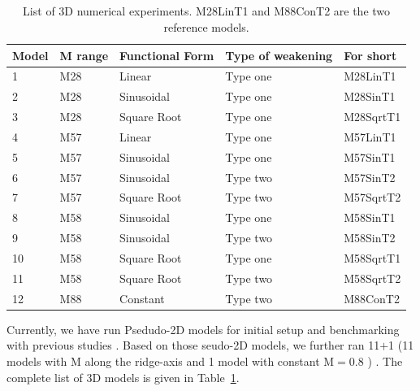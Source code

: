 \subsection{}

\begin{table}[h]
\centering
\begin{tabular}{l l l l l}
\hline
\hline
Model& M range & Functional Form & Type of weakening & For short \\ 
\hline
1    &  M28    &   Linear        & Type one   &  M28LinT1\\
\hline
2    &  M28    &   Sinusoidal    & Type one   &  M28SinT1\\
\hline
3    &  M28    &   Square Root   & Type one   &  M28SqrtT1 \\
\hline
4    &  M57    &   Linear        & Type one   &  M57LinT1 \\
\hline
5    &  M57    &   Sinusoidal    & Type one   &  M57SinT1 \\
\hline
6    &  M57    &   Sinusoidal    & Type two   &  M57SinT2 \\
\hline
7    &  M57    &   Square Root   & Type two   &  M57SqrtT2  \\
\hline
8    &  M58    &   Sinusoidal    & Type one   &  M58SinT1  \\
\hline
9    &  M58    &   Sinusoidal    & Type two   &  M58SinT2   \\
\hline
10   &  M58    &   Square Root   & Type one   &  M58SqrtT1   \\
\hline
11   &  M58    &   Square Root   & Type two   &  M58SqrtT2   \\
\hline
12   &  M88    &   Constant      & Type two   &  M88ConT2 \\
\hline
\hline
\end{tabular}
\caption{List of 3D numerical experiments. M28LinT1 and M88ConT2 are the two reference models.}
\label{Tab1_1}
\end{table}

Currently, we have run  Psedudo-2D models for initial setup and benchmarking with previous studies \citep[e.g.,][]{Buck2005, Tucholke2008}\remove[EC]{)}. Based on those seudo-2D models, we further ran 11$+$1  (11 models with M  along the ridge-axis and 1 model with constant M$=0.8$ ) . The complete list of 3D models is given  in Table~\hyperref[Tab1_1]{\ref{Tab1_1}}. 

